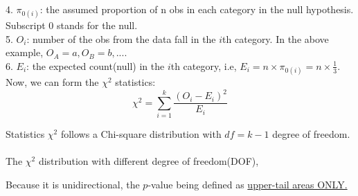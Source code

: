 \documentclass[12pt]{article}
\begin{document}
4. $ \pi_{0(i)} $: the assumed proportion of n obs in each category
in the null hypothesis. Subscript $ 0 $ stands for the null.\\
5. $ O_{i} $: number of the obs from the data fall in the $ i $th 
category. In the above example, $ O_{A} = a, O_{B} = b, ... $.\\
6. $ E_{i} $: the expected count(null) in the $ i $th category, i.e, 
$ E_{i} = n  \times \pi_{0(i)} = n  \times \frac{1}{3} $.\\


Now, we can form the $ \chi^{2} $ statistics:
\begin{equation*}
\chi^{2} = \sum\limits_{i = 1} ^k
\frac{(O_{i} - E_{i})^{2}}{E_{i}}
\end{equation*}

Statistics $ \chi^{2} $ follows a Chi-square distribution with
$ df = k - 1 $ degree of freedom.\\

\newpage
\noindent{}\\


The $ \chi^{2} $ distribution with different degree of freedom(DOF),

\begin{figure}[H]
\end{figure}


Because it is unidirectional, the $ p $-value being defined as
{\underline {upper-tail areas ONLY.}}
\end{document}
